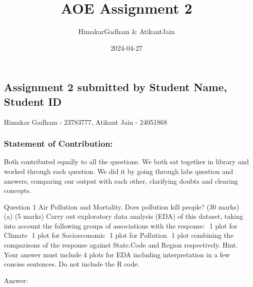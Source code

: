 \documentclass[
]{article}
\title{AOE Assignment 2}
\author{HimakarGadham \& AtikantJain}
\date{2024-04-27}
\begin{document}
\maketitle

\hypertarget{assignment-2-submitted-by-student-name-student-id}{%
\subsection{Assignment 2 submitted by Student Name, Student
ID}\label{assignment-2-submitted-by-student-name-student-id}}

Himakar Gadham - 23783777, Atikant Jain - 24051868

\hypertarget{statement-of-contribution}{%
\subsubsection{Statement of
Contribution:}\label{statement-of-contribution}}

Both contributed equally to all the questions. We both sat together in
library and worked through each question. We did it by going through
labs question and answers, comparing our output with each other,
clarifying doubts and clearing concepts.

Question 1 Air Pollution and Mortality. Does pollution kill people? (30
marks) (a) (5 marks) Carry out exploratory data analysis (EDA) of this
dataset, taking into account the following groups of associations with
the response:  1 plot for Climate  1 plot for Socioeconomic  1 plot for
Pollution  1 plot combining the comparisons of the response against
State.Code and Region respectively. Hint. Your answer must include 4
plots for EDA including interpretation in a few concise sentences. Do
not include the R code.

Answer:
\end{document}
